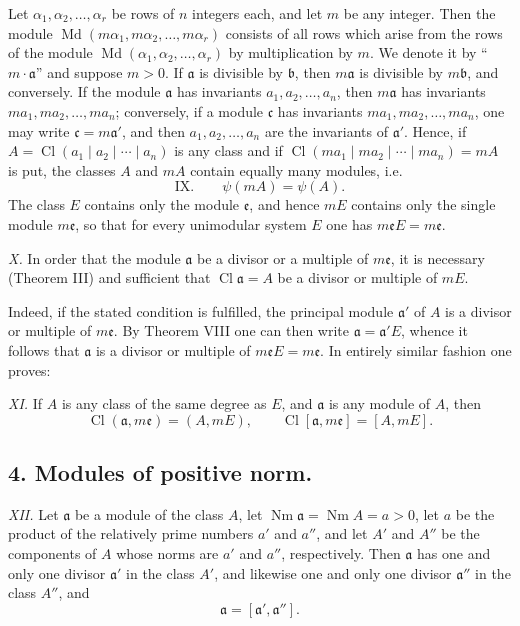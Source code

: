 \documentclass[11pt,a4paper]{article}
\newcommand{\Cl}{\operatorname{Cl}}
\newcommand{\Md}{\operatorname{Md}}
\newcommand{\Nm}{\operatorname{Nm}}
\begin{document}
Let $\alpha_1,\alpha_2,\ldots,\alpha_r$ be rows of $n$ integers each, and let $m$ be any integer. Then the module $\Md(m\alpha_1,m\alpha_2,\ldots,m\alpha_r)$ consists of all rows which arise from the rows of the module $\Md(\alpha_1,\alpha_2,\ldots,\alpha_r)$ by multiplication by $m$. We denote it by ``$m\cdot\mathfrak a$'' and suppose $m>0$. If $\mathfrak a$ is divisible by $\mathfrak b$, then $m\mathfrak a$ is divisible by $m\mathfrak b$, and conversely. If the module $\mathfrak a$ has invariants $a_1,a_2,\ldots,a_n$, then $m\mathfrak a$ has invariants $ma_1,ma_2,\ldots,ma_n$; conversely, if a module $\mathfrak c$ has invariants $ma_1,ma_2,\ldots,ma_n$, one may write $\mathfrak c=m\mathfrak a'$, and then $a_1,a_2,\ldots,a_n$ are the invariants of $\mathfrak a'$. Hence, if $A=\Cl(a_1\mid a_2\mid\cdots\mid a_n)$ is any class and if $\Cl(ma_1\mid ma_2\mid\cdots\mid ma_n)=mA$ is put, the classes $A$ and $mA$ contain equally many modules, i.e.
\[
\text{IX.}\qquad \psi(mA)=\psi(A).
\]
The class $E$ contains only the module $\mathfrak e$, and hence $mE$ contains only the single module $m\mathfrak e$, so that for every unimodular system $E$ one has $m\mathfrak eE=m\mathfrak e$.

\emph{X.} In order that the module $\mathfrak a$ be a divisor or a multiple of $m\mathfrak e$, it is necessary (Theorem III) and sufficient that $\Cl\mathfrak a=A$ be a divisor or multiple of $mE$.

Indeed, if the stated condition is fulfilled, the principal module $\mathfrak a'$ of $A$ is a divisor or multiple of $m\mathfrak e$. By Theorem VIII one can then write $\mathfrak a=\mathfrak a'E$, whence it follows that $\mathfrak a$ is a divisor or multiple of $m\mathfrak eE=m\mathfrak e$. In entirely similar fashion one proves:

\emph{XI.} If $A$ is any class of the same degree as $E$, and $\mathfrak a$ is any module of $A$, then
\[
 \Cl(\mathfrak a,m\mathfrak e)=(A,mE),
 \qquad
 \Cl[\mathfrak a,m\mathfrak e]=[A,mE].
\]

\subsection*{4. Modules of positive norm.}

\emph{XII.} Let $\mathfrak a$ be a module of the class $A$, let $\Nm\mathfrak a=\Nm A=a>0$, let $a$ be the product of the relatively prime numbers $a'$ and $a''$, and let $A'$ and $A''$ be the components of $A$ whose norms are $a'$ and $a''$, respectively. Then $\mathfrak a$ has one and only one divisor $\mathfrak a'$ in the class $A'$, and likewise one and only one divisor $\mathfrak a''$ in the class $A''$, and
\[
 \mathfrak a=[\mathfrak a',\mathfrak a''].
\]
\end{document}
